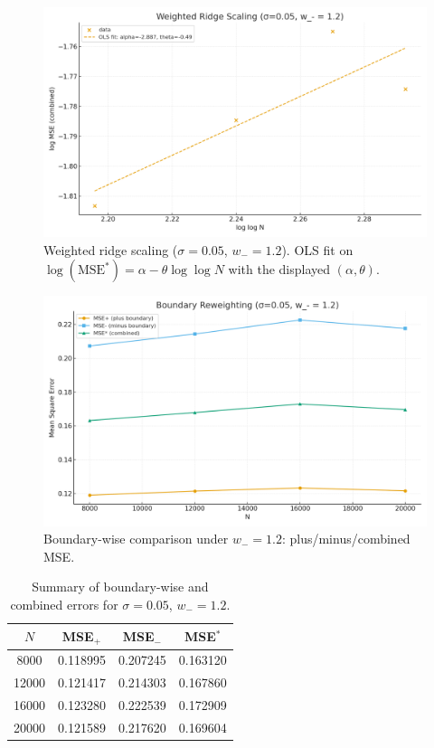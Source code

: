 \documentclass[11pt]{article}
\theoremstyle{remark}
\begin{document}
\begin{figure}[h]
  \centering
  \includegraphics[width=0.78\linewidth]{figures/weighted_scaling.png}
  \caption{Weighted ridge scaling ($\sigma=0.05$, $w_-=1.2$). OLS fit on $\log(\mathrm{MSE}^*)=\alpha-\theta\log\log N$ with the displayed $(\alpha,\theta)$.}
\end{figure}

\begin{figure}[h]
  \centering
  \includegraphics[width=0.78\linewidth]{figures/boundary_reweighting.png}
  \caption{Boundary-wise comparison under $w_-=1.2$: plus/minus/combined MSE.}
\end{figure}

\begin{table}[h]
\centering
\begin{tabular}{c|c|c|c}
\hline
$N$ & MSE$_+$ & MSE$_-$ & MSE$^\ast$ \\
\hline
8000  & 0.118995 & 0.207245 & 0.163120 \\
12000 & 0.121417 & 0.214303 & 0.167860 \\
16000 & 0.123280 & 0.222539 & 0.172909 \\
20000 & 0.121589 & 0.217620 & 0.169604 \\
\hline
\end{tabular}
\caption{Summary of boundary-wise and combined errors for $\sigma=0.05$, $w_-=1.2$.}
\end{table}
\end{document}
